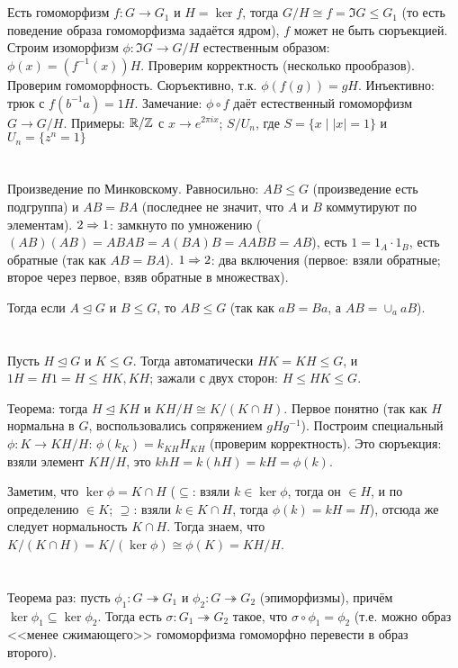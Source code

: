 \section{} %
Есть гомоморфизм $f \colon G \to G_1$ и $H=\ker f$, тогда $G/H \cong f = \Im G \le G_1$
(то есть поведение образа гомоморфизма задаётся ядром), $f$ может не быть сюръекцией.
Строим изоморфизм $\phi \colon \Im G \to G / H$ естественным образом: $\phi(x)=(f^{-1}(x))H$.
Проверим корректность (несколько прообразов).
Проверим гомоморфность.
Сюръективно, т.к. $\phi(f(g))=gH$.
Инъективно: трюк с $f(b^{-1}a)=1H$.
Замечание: $\phi \circ f$ даёт естественный гомоморфизм $G \to G/H$.
Примеры: $\mathbb{R}/\mathbb{Z}$ с $x\to e^{2\pi ix}$; $S/U_n$, где $S=\{x\mid |x|=1\}$ и $U_n=\{z^n=1\}$

\section{} %
Произведение по Минковскому.
Равносильно: $AB \le G$ (произведение есть подгруппа) и $AB=BA$ (последнее не значит, что $A$ и $B$ коммутируют по элементам).
$2 \Rightarrow 1$: замкнуто по умножению ($(AB)(AB)=ABAB=A(BA)B=AABB=AB$),
есть $1=1_A\cdot 1_B$, есть обратные (так как $AB=BA$).
$1 \Rightarrow 2$: два включения (первое: взяли обратные; второе через первое, взяв обратные в множествах).

Тогда если $A \unlhd G$ и $B \le G$, то $AB \le G$ (так как $aB=Ba$, а $AB=\cup_a aB$).

\section{} %
Пусть $H \unlhd G$ и $K \le G$.
Тогда автоматически $HK=KH \le G$, и $1H=H1=H\le HK, KH$;
зажали с двух сторон: $H \le HK \le G$.

Теорема: тогда $H \unlhd KH$ и $KH / H \cong K / (K \cap H)$.
Первое понятно (так как $H$ нормальна в $G$, воспользовались сопряжением $gHg^{-1}$).
Построим специальный $\phi \colon K \to KH / H$: $\phi(k_{K})=k_{KH}H_{KH}$ (проверим корректность).
Это сюръекция: взяли элемент $KH/H$, это $khH=k(hH)=kH=\phi(k)$.

Заметим, что $\ker \phi=K \cap H$ ($\subseteq$: взяли $k \in \ker \phi$, тогда
он $\in H$, и по определению $\in K$; $\supseteq$: взяли $k \in K \cap H$,
тогда $\phi(k)=kH=H$), отсюда же следует нормальность $K\cap H$.
Тогда знаем, что $K/(K\cap H) = K/(\ker \phi) \cong \phi(K) = KH / H$.

\section{} %
Теорема раз:
пусть $\phi_1 \colon G \twoheadrightarrow G_1$ и
$\phi_2 \colon G \twoheadrightarrow G_2$ (эпиморфизмы),
причём $\ker \phi_1 \subseteq \ker \phi_2$.
Тогда есть $\sigma \colon G_1 \twoheadrightarrow G_2$ такое, что $\sigma \circ \phi_1 = \phi_2$
(т.е. можно образ <<менее сжимающего>> гомоморфизма гомоморфно перевести в образ второго).

